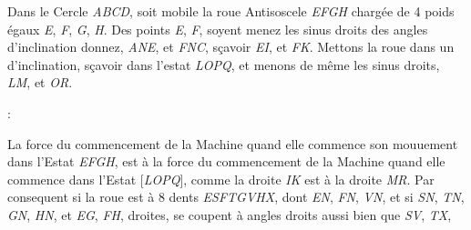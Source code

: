                 \vspace*{6mm}
               \pstart 
\normalsize
\noindent
[25~r\textsuperscript{o}]
\pend
\pstart
\centering
\noindent
{}
\pend
\count{}
\count{}
\pstart \noindent {}Dans le Cercle \textit{ABCD}, soit mobile la roue Antisoscele \textit{EFGH} charg\'{e}e de 4 poids\protect{}\protect{}                    
  \'{e}gaux \textit{E}, \textit{F}, \textit{G}, \textit{H}. \pend 
  \pstart Des points \textit{E}, \textit{F}, soyent menez les sinus  droits des angles d'inclination donnez, \textit{ANE}, et \textit{FNC}, s\c{c}avoir \textit{EI}, et \textit{FK}. \pend 
  \pstart  Mettons la roue\protect{} dans un   d'inclination\protect{}, s\c{c}avoir dans l'estat \textit{LOPQ},  et menons de m\^{e}me les sinus droits, \textit{LM}, et \textit{OR}. \pend 
\pstart \vspace{0.8em} 
\begin{center}%
:%
%
\end{center}
\pend 
\pstart  
\noindent%
La force du commencement de la Machine\protect{} quand elle commence son mouuement dans l'Estat \textit{EFGH}, est \`{a} la force du commencement de la Machine%
 quand elle commence dans l'Estat [\textit{LOPQ}], comme la droite \textit{IK} est \`{a} la droite \textit{MR}. Par consequent si la roue est \`{a} 8 dents \textit{ESFTGVHX},
dont \textit{EN}, \textit{FN}, \textit{VN},
et si \textit{SN}, \textit{TN}, \textit{GN}, \textit{HN}, et \textit{EG}, \textit{FH}, droites,
se coupent \`{a} angles droits aussi bien que \textit{SV}, \textit{TX},
